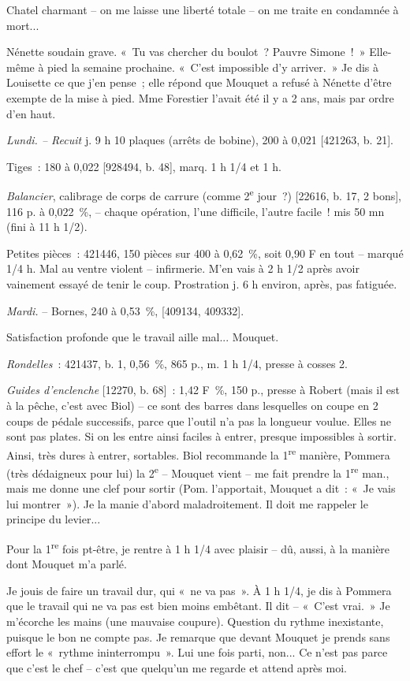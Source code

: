 \documentclass[french,twoside]{book} %
\begin{document}
\noindent Chatel charmant – on me laisse une liberté totale – on me traite en condamnée à mort...\par
Nénette soudain grave. « Tu vas chercher du boulot ? Pauvre Simone ! » Elle-même à pied la semaine prochaine. « C'est impossible d'y arriver. » Je dis à Louisette ce que j'en pense ; elle répond que Mouquet a refusé à Nénette d'être exempte de la mise à pied. Mme Forestier l'avait été il y a 2 ans, mais par ordre d'en haut.\par
{\itshape Lundi. – Recuit} j. 9 h 10 plaques (arrêts de bobine), 200 à 0,021 [421263, b. 21].\par
Tiges : 180 à 0,022 [928494, b. 48], marq. 1 h 1/4 et 1 h.\par
{\itshape Balancier}, calibrage de corps de carrure (comme 2\textsuperscript{e} jour ?) [22616, b. 17, 2 bons], 116 p. à 0,022 \%, – chaque opération, l'une difficile, l'autre facile ! mis 50 mn (fini à 11 h 1/2).\par
Petites pièces : 421446, 150 pièces sur 400 à 0,62 \%, soit 0,90 F en tout – marqué 1/4 h. Mal au ventre violent – infirmerie. M'en vais à 2 h 1/2 après avoir vainement essayé de tenir le coup. Prostration j. 6 h environ, après, pas fatiguée.\par
{\itshape Mardi.} – Bornes, 240 à 0,53 \%, [409134, 409332].\par
Satisfaction profonde que le travail aille mal... Mouquet.\par
{\itshape Rondelles} : 421437, b. 1, 0,56 \%, 865 p., m. 1 h 1/4, presse à cosses 2.\par
{\itshape Guides d'enclenche} [12270, b. 68] : 1,42 F \%, 150 p., presse à Robert (mais il est à la pêche, c'est avec Biol) – ce sont des barres dans lesquelles on coupe en 2 coups de pédale successifs, parce que l'outil n'a pas la longueur voulue. Elles ne sont pas plates. Si on les entre ainsi faciles à entrer, presque impossibles à sortir. Ainsi, très dures à entrer, sortables. Biol recommande la 1\textsuperscript{re} manière, Pommera (très dédaigneux pour lui) la 2\textsuperscript{e} – Mouquet vient – me fait prendre la 1\textsuperscript{re} man., mais me donne une clef pour sortir (Pom. l'apportait, Mouquet a dit : « Je vais lui montrer »). Je la manie d'abord maladroitement. Il doit me rappeler le principe du levier...\par
Pour la 1\textsuperscript{re} fois pt-être, je rentre à 1 h 1/4 avec plaisir – dû, aussi, à la manière dont Mouquet m'a parlé.\par
Je jouis de faire un travail dur, qui « ne va pas ». À 1 h 1/4, je dis à Pommera que le travail qui ne va pas est bien moins embêtant. Il dit – « C'est vrai. » Je m'écorche les mains (une mauvaise coupure). Question du rythme inexistante, puisque le bon ne compte pas. Je remarque que devant Mouquet je prends sans effort le « rythme ininterrompu ». Lui une fois parti, non... Ce n'est pas parce que c'est le chef – c'est que quelqu'un me regarde et attend après moi.\par
\end{document}
